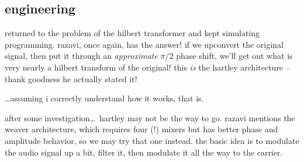 \subsection*{engineering}
returned to the problem of the hilbert transformer and kept simulating \amp
programming. razavi, once again, has the answer! if we upconvert the original
signal, then put it through an \emph{approximate} \(\pi/2\) phase shift, we'll
get out what is very nearly a hilbert transform of the original! this \emph{is}
the hartley architecture -- thank goodness he actually stated it!

\ldots assuming i correctly understand how it works, that is.

after some investigation\ldots\ hartley may not be the way to go. razavi
mentions the weaver architecture, which requires four (!) mixers but has better
phase and amplitude behavior, so we may try that one instead. the basic idea is
to modulate the audio signal up a bit, filter it, then modulate it all the way
to the \rf carrier.

